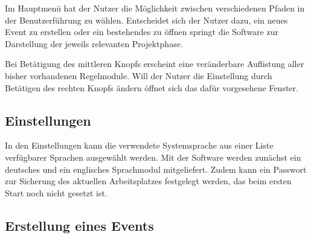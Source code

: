 \documentclass[11pt]{article}
\begin{document}
\vspace{1cm}

Im Hauptmenü hat der Nutzer die Möglichkeit zwischen verschiedenen Pfaden in der Benutzerführung zu wählen.
Entscheidet sich der Nutzer dazu, ein neues Event zu erstellen oder ein bestehendes zu öffnen springt die Software zur Darstellung der jeweils relevanten Projektphase.

Bei Betätigung des mittleren Knopfs erscheint eine veränderbare Auflistung aller bisher vorhandenen Regelmodule.
Will der Nutzer die Einstellung durch Betätigen des rechten Knopfs ändern öffnet sich das dafür vorgesehene Fenster.

\subsection{Einstellungen}


\vspace{1cm}

In den Einstellungen kann die verwendete Systemsprache aus einer Liste verfügbarer Sprachen ausgewählt werden. Mit der Software werden zunächst ein deutsches und ein englisches Sprachmodul mitgeliefert. Zudem kann ein Passwort zur Sicherung des aktuellen Arbeitsplatzes festgelegt werden, das beim ersten Start noch nicht gesetzt ist.

\subsection{Erstellung eines Events}
\end{document}
